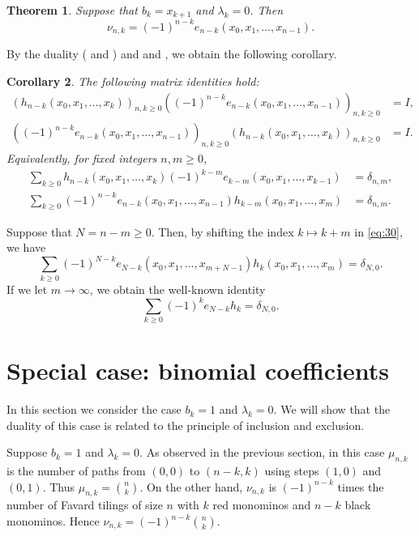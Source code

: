 \documentclass[oneside]{book}
\numberwithin{equation}{section}
\newtheorem{thm}{Theorem}[section]
\newtheorem{cor}[thm]{Corollary}
\theoremstyle{definition}
\begin{document}
\begin{thm}\label{thm:4}
  Suppose that \( b_k=x_{k+1} \) and \( \lambda_k =0 \).
  Then
  \[
    \nu_{n,k} = (-1)^{n-k} e_{n-k}(x_0,x_1,\dots,x_{n-1}).
  \]
\end{thm}

By the duality ( and )
and  and ,
we obtain the following corollary.

\begin{cor}\label{cor:1}
  The following matrix identities hold:
\begin{align*}
  \left( h_{n-k}(x_0,x_1,\dots,x_{k}) \right)_{n,k\ge0}
  \left( (-1)^{n-k} e_{n-k}(x_0,x_1,\dots,x_{n-1}) \right)_{n,k\ge0}
  &= I,\\
  \left( (-1)^{n-k} e_{n-k}(x_0,x_1,\dots,x_{n-1}) \right)_{n,k\ge0}
  \left( h_{n-k}(x_0,x_1,\dots,x_{k}) \right)_{n,k\ge0}
  &= I.
\end{align*}
Equivalently, for fixed integers \( n,m\ge0 \),
\begin{align}
\label{eq:31}  \sum_{k\ge 0} 
  h_{n-k}(x_0,x_1,\dots,x_{k}) (-1)^{k-m} e_{k-m}(x_0,x_1,\dots,x_{k-1}) 
  &= \delta_{n,m},\\
\label{eq:30}  \sum_{k\ge 0} (-1)^{n-k} e_{n-k}(x_0,x_1,\dots,x_{n-1}) h_{k-m}(x_0,x_1,\dots,x_{m})
  &= \delta_{n,m}.
\end{align}
\end{cor}

Suppose that \( N=n-m\ge0 \).
Then, by shifting the index \( k\mapsto k+m  \) in \eqref{eq:30}, we have
\[
  \sum_{k\ge 0} (-1)^{N-k} e_{N-k}(x_0,x_1,\dots,x_{m+N-1})
  h_{k}(x_0,x_1,\dots,x_{m}) = \delta_{N,0}.
\]
If we let \( m\to \infty \), we obtain
the well-known identity
\[
  \sum_{k\ge 0} (-1)^{k} e_{N-k} h_{k} = \delta_{N,0}.
\]

\section{Special case: binomial coefficients}

In this section we consider the case \( b_k=1 \) and
\( \lambda_k=0 \). We will show that the duality of this case is
related to the principle of inclusion and exclusion.

Suppose \( b_k=1 \) and \( \lambda_k=0 \). As observed in the previous
section, in this case \( \mu_{n,k} \) is the number of paths from
\( (0,0) \) to \( (n-k,k) \) using steps \( (1,0) \) and \( (0,1) \).
Thus \( \mu_{n,k} = \binom{n}{k} \). On the other hand,
\( \nu_{n,k} \) is \( (-1)^{n-k} \) times the number of Favard tilings
of size \( n \) with \( k \) red monominos and \( n-k \) black
monominos. Hence \( \nu_{n,k} = (-1)^{n-k}\binom{n}{k} \).
\end{document}
